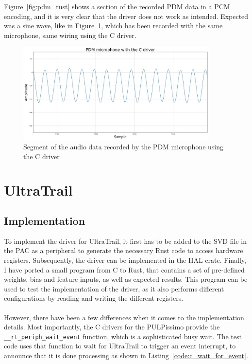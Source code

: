 Figure~\ref{fig:pdm_rust} shows a section of the recorded PDM data in a PCM encoding, and it is very clear that the driver does not work as intended.
Expected was a sine wave, like in Figure~\ref{fig:pdm_c}, which has been recorded with the same microphone, same wiring using the C driver.

\begin{figure}[H]
    \centering
    \includegraphics[width=0.9\textwidth]{figures/pdm/pdm_c.png}
    \caption[Segment of the audio data recorded by the PDM microphone using the C driver]{Segment of the audio data recorded by the PDM microphone using the C driver}
    \label{fig:pdm_c}
\end{figure}

\begin{minipage}{\textwidth}
\section{UltraTrail}

\subsection{Implementation}

To implement the driver for UltraTrail, it first has to be added to the SVD file in the PAC
as a peripheral to generate the necessary Rust code to access hardware registers.
Subsequently, the driver can be implemented in the HAL crate.
Finally, I have ported a small program from C to Rust, that contains a set of pre-defined
weights, bias and feature inputs, as well as expected results.
This program can be used to test the implementation of the driver, as it also
performs different configurations by reading and writing the different registers.
\\\\
However, there have been a few differences when it comes to the implementation details.
Most importantly, the C drivers for the PULPissimo provide the \lstinline{__rt_periph_wait_event} function,
which is a sophisticated busy wait.
The test code uses that function to wait for UltraTrail to trigger an event interrupt, to announce that
it is done processing as shown in Listing~\ref{code:c_wait_for_event}.
\end{minipage}

